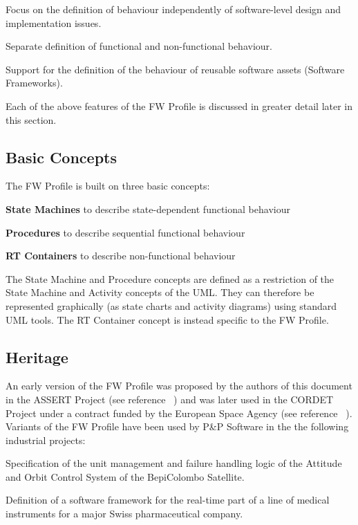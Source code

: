 \documentclass[definition]{../fwprofile}
\begin{document}
\begin{fw_enumerate}
\item Focus on the definition of behaviour independently of software-level design and
implementation issues.
\item Separate definition of functional and non-functional behaviour.
\item Support for the definition of the behaviour of reusable software assets (Software
Frameworks).
\end{fw_enumerate}

Each of the above features of the FW Profile is discussed in greater detail later in this section.

\subsection{Basic Concepts}\label{sec:basicConcepts} 
The FW Profile is built on three basic concepts:

\begin{fw_enumerate}
\item \textbf{State Machines} to describe state-dependent functional behaviour
\item \textbf{Procedures} to describe sequential functional behaviour
\item \textbf{RT Containers} to describe non-functional behaviour
\end{fw_enumerate}

The State Machine and Procedure concepts are defined as a restriction of the State Machine
and Activity concepts of the UML. They can therefore be represented graphically (as state charts and activity diagrams) using standard UML tools. The RT Container concept is instead specific to the FW Profile.

\subsection{Heritage}
An early version of the FW Profile was proposed by the authors of this document in the
ASSERT Project (see reference ~\cite{ref:rd-1}) and was later used in the CORDET Project under a contract funded by the European Space Agency (see reference ~\cite{ref:rd-2}). Variants of the FW Profile have been used by P\&P Software in the the following industrial projects:

\begin{fw_itemize} 
\item Specification of the unit management and failure handling logic of the Attitude and Orbit Control System of the BepiColombo Satellite.
\item Definition of a software framework for the real-time part of a line of medical instruments for a major Swiss pharmaceutical company.
\end{fw_itemize}
\end{document}
